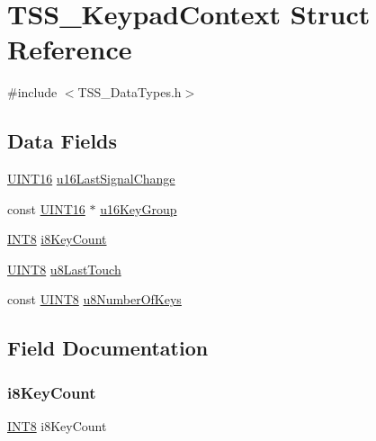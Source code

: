 \hypertarget{struct_t_s_s___keypad_context}{}\section{T\+S\+S\+\_\+\+Keypad\+Context Struct Reference}
\label{struct_t_s_s___keypad_context}


{\ttfamily \#include $<$T\+S\+S\+\_\+\+Data\+Types.\+h$>$}

\subsection*{Data Fields}
\begin{DoxyCompactItemize}
\item 
\hyperlink{_t_s_s___data_types_8h_a09f1a1fb2293e33483cc8d44aefb1eb1}{U\+I\+N\+T16} \hyperlink{struct_t_s_s___keypad_context_a5ed86a569fda2cb73193a2e6b5babdcc}{u16\+Last\+Signal\+Change}
\item 
const \hyperlink{_t_s_s___data_types_8h_a09f1a1fb2293e33483cc8d44aefb1eb1}{U\+I\+N\+T16} $\ast$ \hyperlink{struct_t_s_s___keypad_context_ababf869f1d2f7990756e9a7d593859fd}{u16\+Key\+Group}
\item 
\hyperlink{_t_s_s___data_types_8h_a7ebe70ceca856797319175e30bcf003d}{I\+N\+T8} \hyperlink{struct_t_s_s___keypad_context_ad0f9eb1e1fa080f19dff4320881356e3}{i8\+Key\+Count}
\item 
\hyperlink{_t_s_s___data_types_8h_ab27e9918b538ce9d8ca692479b375b6a}{U\+I\+N\+T8} \hyperlink{struct_t_s_s___keypad_context_aebe4f5d0bfb38fe90321403d622f2904}{u8\+Last\+Touch}
\item 
const \hyperlink{_t_s_s___data_types_8h_ab27e9918b538ce9d8ca692479b375b6a}{U\+I\+N\+T8} \hyperlink{struct_t_s_s___keypad_context_a72e2e9a236c27ce7958e22e99f47e359}{u8\+Number\+Of\+Keys}
\end{DoxyCompactItemize}


\subsection{Field Documentation}
\mbox{\label{struct_t_s_s___keypad_context_ad0f9eb1e1fa080f19dff4320881356e3}} 
\subsubsection{\texorpdfstring{i8\+Key\+Count}{i8KeyCount}}
{\footnotesize\ttfamily \hyperlink{_t_s_s___data_types_8h_a7ebe70ceca856797319175e30bcf003d}{I\+N\+T8} i8\+Key\+Count}

